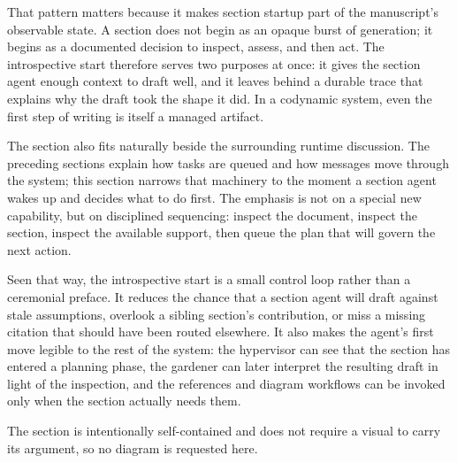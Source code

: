 \documentclass[11pt]{article}
\begin{document}
That pattern matters because it makes section startup part of the manuscript's observable state. A section does not begin as an opaque burst of generation; it begins as a documented decision to inspect, assess, and then act. The introspective start therefore serves two purposes at once: it gives the section agent enough context to draft well, and it leaves behind a durable trace that explains why the draft took the shape it did. In a codynamic system, even the first step of writing is itself a managed artifact.

The section also fits naturally beside the surrounding runtime discussion. The preceding sections explain how tasks are queued and how messages move through the system; this section narrows that machinery to the moment a section agent wakes up and decides what to do first. The emphasis is not on a special new capability, but on disciplined sequencing: inspect the document, inspect the section, inspect the available support, then queue the plan that will govern the next action.

Seen that way, the introspective start is a small control loop rather than a ceremonial preface. It reduces the chance that a section agent will draft against stale assumptions, overlook a sibling section's contribution, or miss a missing citation that should have been routed elsewhere. It also makes the agent's first move legible to the rest of the system: the hypervisor can see that the section has entered a planning phase, the gardener can later interpret the resulting draft in light of the inspection, and the references and diagram workflows can be invoked only when the section actually needs them.

The section is intentionally self-contained and does not require a visual to carry its argument, so no diagram is requested here.
\end{document}
